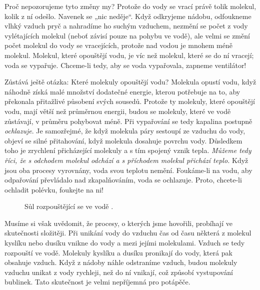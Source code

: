     Proč nepozorujeme tyto změny my? Protože do vody se vrací právě tolik molekul, kolik z ní
    odešlo. Navenek se „nic neděje“. Když odkryjeme nádobu, odfoukneme vlhký vzduch pryč a nahradíme
    ho suchým vzduchem, nezmění se počet z vody vylétajících molekul (neboť závisí pouze na pohybu
    ve vodě), ale velmi se změní počet molekul do vody se vracejících, protože nad vodou je mnohem
    méně molekul. Molekul, které opouštějí vodu, je víc než molekul, které se do ní vracejí; voda se
    vypařuje. Chceme-li tedy, aby se voda vypařovala, zapneme ventilátor!
    
    Zůstává ještě otázka: Které molekuly opouštějí vodu? Molekula opustí vodu, když náhodně získá
    malé množství dodatečné energie, kterou potřebuje na to, aby překonala přitažlivé působení svých
    sousedů. Protože ty molekuly, které opouštějí vodu, mají větší než průměrnou energii, budou se
    molekuly, které ve vodě zůstávají, v průměru pohybovat méně. Při vypařování se tedy kapalina
    postupně \emph{ochlazuje}. Je samozřejmé, že když molekula páry sestoupí ze vzduchu do vody,
    objeví se silné přitahování, když molekula dosahuje povrchu vody. Důsledkem toho je zrychlení
    přicházející molekuly a s tím spojený vznik tepla. \emph{Můžeme tedy říci, že s odchodem molekul
    odchází a s příchodem molekul přichází teplo.} Když jsou oba procesy vyrovnány, voda svou
    teplotu nemění. Foukáme-li na vodu, aby odpařování převládalo nad zkapalňováním, voda se
    ochlazuje. Proto, chcete-li ochladit polévku, foukejte na ni!
    
    \begin{figure}[ht!]    %
      \centering
      \caption{Sůl rozpouštějící se ve vodě \cite[s.~21]{Feynman01}.}
      \label{fyz:fig012}
    \end{figure}

    Musíme si však uvědomit, že procesy, o kterých jsme hovořili, probíhají ve skutečnosti
    složitěji. Při unikání vody do vzduchu čas od času některá z molekul kyslíku nebo dusíku vnikne
    do vody a  mezi jejími molekulami. Vzduch se tedy rozpouští ve vodě. Molekuly
    kyslíku a dusíku pronikají do vody, která pak obsahuje vzduch. Když z nádoby náhle odstraníme
    vzduch, budou molekuly vzduchu unikat z vody rychleji, než do ní vnikají, což způsobí
    vystupování bublinek. Tato skutečnost je velmi nepříjemná pro potápěče.
  
